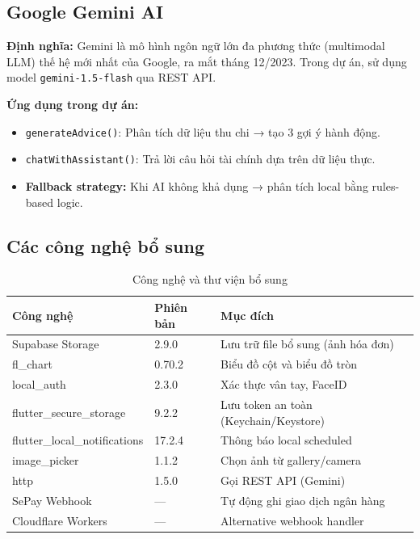 \subsection{Google Gemini AI}

\textbf{Định nghĩa:} Gemini là mô hình ngôn ngữ lớn đa phương thức (multimodal LLM) thế hệ mới nhất của Google, ra mắt tháng 12/2023. Trong dự án, sử dụng model \texttt{gemini-1.5-flash} qua REST API.

\textbf{Ứng dụng trong dự án:}
\begin{itemize}
  \item \texttt{generateAdvice()}: Phân tích dữ liệu thu chi → tạo 3 gợi ý hành động.
  \item \texttt{chatWithAssistant()}: Trả lời câu hỏi tài chính dựa trên dữ liệu thực.
  \item \textbf{Fallback strategy:} Khi AI không khả dụng → phân tích local bằng rules-based logic.
\end{itemize}

\subsection{Các công nghệ bổ sung}

\begin{table}[H]
\centering
\caption{Công nghệ và thư viện bổ sung}
\begin{tabularx}{\textwidth}{|l|l|X|}
\hline
\textbf{Công nghệ} & \textbf{Phiên bản} & \textbf{Mục đích} \\
\hline
Supabase Storage & 2.9.0 & Lưu trữ file bổ sung (ảnh hóa đơn) \\
\hline
fl\_chart & 0.70.2 & Biểu đồ cột và biểu đồ tròn \\
\hline
local\_auth & 2.3.0 & Xác thực vân tay, FaceID \\
\hline
flutter\_secure\_storage & 9.2.2 & Lưu token an toàn (Keychain/Keystore) \\
\hline
flutter\_local\_notifications & 17.2.4 & Thông báo local scheduled \\
\hline
image\_picker & 1.1.2 & Chọn ảnh từ gallery/camera \\
\hline
http & 1.5.0 & Gọi REST API (Gemini) \\
\hline
SePay Webhook & --- & Tự động ghi giao dịch ngân hàng \\
\hline
Cloudflare Workers & --- & Alternative webhook handler \\
\hline
\end{tabularx}
\end{table}

